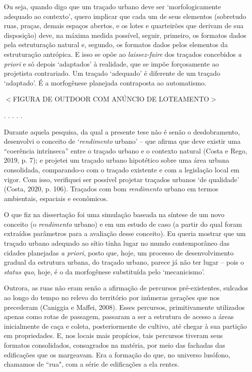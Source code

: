 \documentclass[12pt, a4paper]{book} %
\begin{document}
        Ou seja, quando digo que um traçado urbano deve ser `morfologicamente adequado ao contexto', quero implicar que cada um de seus elementos (sobretudo ruas, praças, demais espaços abertos, e os lotes e quarteirões que derivam de sua disposição) deve, na máxima medida possível, seguir, primeiro, os formatos dados pela estruturação natural e, segundo, os formatos dados pelos elementos da estruturação antrópica. E isso se opõe ao \textit{laissez-faire} dos traçados concebidos \textit{a priori} e só depois `adaptados' à realidade, que se impõe forçosamente ao projetista contrariado. Um traçado `adequado' é diferente de um traçado `adaptado'. É a morfogênese planejada contraposta ao automatismo.

        $<$FIGURA DE OUTDOOR COM ANÚNCIO DE LOTEAMENTO$>$

        \begin{center}
        . . . . .
        \end{center}

        Durante aquela pesquisa, da qual a presente tese não é senão o desdobramento, desenvolvi o conceito de `\textit{rendimento} urbano' – que afirma que deve existir uma ``coerência intrínseca'' entre o traçado urbano e o contexto natural (Costa e Rego, 2019, p. 7); e projetei um traçado urbano hipotético sobre uma área urbana consolidada, comparando-o com o traçado existente e com a legislação local em vigor. Com isso, verifiquei ser possível projetar traçados urbanos `de qualidade' (Costa, 2020, p. 106). Traçados com bom \textit{rendimento} urbano em termos ambientais, espaciais e econômicos.

        O que fiz na dissertação foi uma simulação baseada na síntese de um novo conceito (o \textit{rendimento} urbano) e em um estudo de caso (a partir do qual foram extraídos parâmetros para a avaliação desse conceito). Eu queria mostrar que um traçado urbano adequado ao sítio tinha lugar no mundo contemporâneo das cidades planejadas \textit{a priori}, posto que, hoje, um processo de desenvolvimento gradual da estrutura urbana, do traçado urbano, parece já não ter lugar – pois o \textit{status quo}, hoje, é o da morfogênese substituída pelo `mecanicismo'. 

        Outrora, as ruas não eram senão a afirmação de percursos pré-existentes, sulcados ao longo do tempo no relevo do território por inúmeras gerações que nos precederam (Caniggia e Maffei, 2008).   Esses percursos, primitivamente utilizados apenas como rotas de passagem, passaram a ser a estrutura de acesso a áreas inicialmente de caça e coleta, posteriormente de cultivo, até chegar à sua partição em propriedades. E, nos locais mais propícios, tais percursos tiveram seus formatos consolidados, consagrados na matéria, por meio das fachadas das edificações que os margeavam. Era a formação do que, no universo lusófono, chamamos de ``rua", com a série de edificações a ela rentes.
\end{document}
